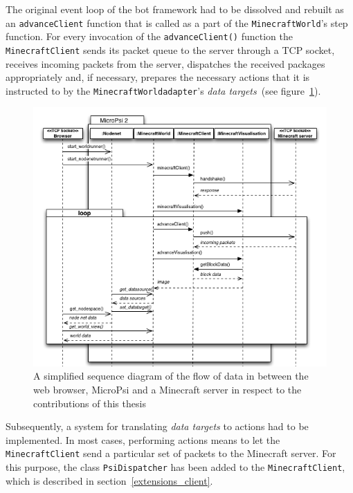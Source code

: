 The original event loop of the bot framework had to be dissolved and rebuilt as an \texttt{advanceClient} function that is called as a part of the \texttt{MinecraftWorld}'s step function. For every invocation of the \texttt{advanceClient()} function the \texttt{MinecraftClient} sends its packet queue to the server through a TCP socket, receives incoming packets from the server, dispatches the received packages appropriately and, if necessary, prepares the necessary actions that it is instructed to by the \texttt{MinecraftWorldadapter}'s \emph{data targets}~(see figure~\ref{spock_loop}).

\begin{figure}[h]
  \centering
    \includegraphics[width=15cm]{graphics/sequencediagram_v14}
  \caption{A simplified sequence diagram of the flow of data in between the web browser, MicroPsi and a Minecraft server in respect to the contributions of this thesis}
  \label{spock_loop}
\end{figure}

Subsequently, a system for translating \emph{data targets} to actions had to be implemented. In most cases, performing actions means to let the \texttt{MinecraftClient} send a particular set of packets to the Minecraft server. For this purpose, the class \texttt{PsiDispatcher} has been added to the \texttt{MinecraftClient}, which is described in section~\ref{extensions_client}.


